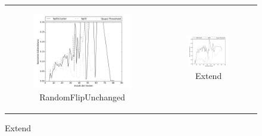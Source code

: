 \documentclass[12pt,a4paper,onecolumn,oneside,titlepage]{article}
\begin{document}
\begin{figure}
  \centering
  \begin{tabular}[c]{cc}
    \begin{subfigure}[b]{0.5\textwidth}
       \includegraphics[scale=0.35]{plots/quality_random.png}
       \caption{RandomFlipUnchanged}
       \label{fig:qual_random}
       
    \end{subfigure}&
    \begin{subfigure}[b]{0.5\textwidth}
         \includegraphics[scale=0.35]{plots/quality_extend.png}
         \caption{Extend}
         \label{fig:qual_extend}
       

\end{subfigure}
\end{tabular}
\end{figure}
\end{document}
